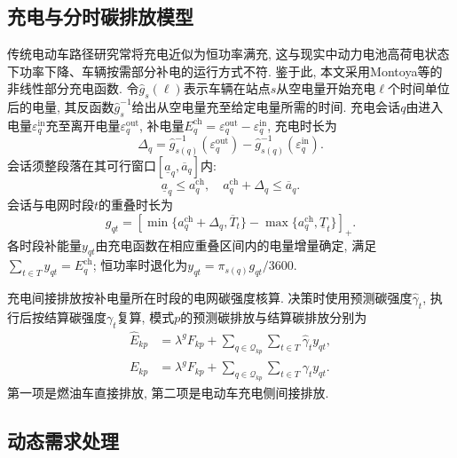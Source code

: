 \documentclass{setp-new}
\begin{document}
\subsection{充电与分时碳排放模型}

传统电动车路径研究常将充电近似为恒功率满充,
这与现实中动力电池高荷电状态下功率下降、车辆按需部分补电的运行方式不符.
鉴于此, 本文采用Montoya等\cite{ref:46}的非线性部分充电函数.
令$\widehat g_s(\ell)$表示车辆在站点$s$从空电量开始充电$\ell$个时间单位后的电量,
其反函数$\widehat g_s^{-1}$给出从空电量充至给定电量所需的时间.
充电会话$q$由进入电量$\varepsilon_q^{\mathrm{in}}$充至离开电量$\varepsilon_q^{\mathrm{out}}$,
补电量$E_q^{\mathrm{ch}}=\varepsilon_q^{\mathrm{out}}-\varepsilon_q^{\mathrm{in}}$,
充电时长为
\begin{equation}
\Delta_q=\widehat g_{s(q)}^{-1}(\varepsilon_q^{\mathrm{out}})
-\widehat g_{s(q)}^{-1}(\varepsilon_q^{\mathrm{in}}).
\label{eq:charge_duration}
\end{equation}
会话须整段落在其可行窗口$[\underline a_q,\overline a_q]$内:
\begin{equation}
\underline a_q\le a_q^{\mathrm{ch}},\quad a_q^{\mathrm{ch}}+\Delta_q\le\overline a_q.
\label{eq:charge_window}
\end{equation}
会话与电网时段$t$的重叠时长为
\begin{equation}
g_{qt}=[\min\{a_q^{\mathrm{ch}}+\Delta_q,\overline T_t\}-\max\{a_q^{\mathrm{ch}},\underline T_t\}]_+ .
\label{eq:charge_overlap}
\end{equation}
各时段补能量$y_{qt}$由充电函数在相应重叠区间内的电量增量确定,
满足$\sum_{t\in T}y_{qt}=E_q^{\mathrm{ch}}$; 恒功率时退化为$y_{qt}=\pi_{s(q)}g_{qt}/3600$.

充电间接排放按补电量所在时段的电网碳强度核算.
决策时使用预测碳强度$\widehat\gamma_t$, 执行后按结算碳强度$\gamma_t$复算,
模式$p$的预测碳排放与结算碳排放分别为
\begin{equation}
\begin{aligned}
\widehat E_{kp}&=\lambda^g F_{kp}
+\sum_{q\in\mathcal Q_{kp}}\sum_{t\in T}\widehat\gamma_t y_{qt},\\
E_{kp}&=\lambda^g F_{kp}
+\sum_{q\in\mathcal Q_{kp}}\sum_{t\in T}\gamma_t y_{qt}.
\end{aligned}
\label{eq:carbon}
\end{equation}
第一项是燃油车直接排放, 第二项是电动车充电侧间接排放.

\subsection{动态需求处理}
\label{sec:dynamic-demand-model}
\end{document}
